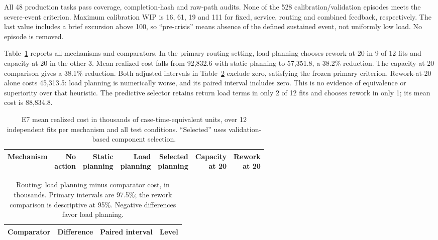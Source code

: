 All 48 production tasks pass coverage, completion-hash and raw-path audits. None of the 528 calibration/validation episodes meets the severe-event criterion. Maximum calibration WIP is 16, 61, 19 and 111 for fixed, service, routing and combined feedback, respectively. The last value includes a brief excursion above 100, so ``pre-crisis'' means absence of the defined sustained event, not uniformly low load. No episode is removed.

Table~\ref{tab:e7cost} reports all mechanisms and comparators. In the primary routing setting, load planning chooses rework-at-20 in 9 of 12 fits and capacity-at-20 in the other 3. Mean realized cost falls from 92,832.6 with static planning to 57,351.8, a 38.2\% reduction. The capacity-at-20 comparison gives a 38.1\% reduction. Both adjusted intervals in Table~\ref{tab:e7contrast} exclude zero, satisfying the frozen primary criterion. Rework-at-20 alone costs 45,313.5: load planning is numerically worse, and its paired interval includes zero. This is no evidence of equivalence or superiority over that heuristic. The predictive selector retains return load terms in only 2 of 12 fits and chooses rework in only 1; its mean cost is 88,834.8.

\begin{table}[t]
\caption{E7 mean realized cost in thousands of case-time-equivalent units, over 12 independent fits per mechanism and all test conditions. ``Selected'' uses validation-based component selection.}\label{tab:e7cost}
\centering\small\setlength{\tabcolsep}{3pt}
\begin{tabular}{lrrrrrr}\toprule
Mechanism & \shortstack{No\\action} & \shortstack{Static\\planning} & \shortstack{Load\\planning} & \shortstack{Selected\\planning} & \shortstack{Capacity\\at 20} & \shortstack{Rework\\at 20}\\\midrule

\end{tabular}
\end{table}
\begin{table}[t]
\caption{Routing: load planning minus comparator cost, in thousands. Primary intervals are 97.5\%; the rework comparison is descriptive at 95\%. Negative differences favor load planning.}\label{tab:e7contrast}
\centering\small
\begin{tabular}{lrrr}\toprule
Comparator & Difference & Paired interval & Level\\\midrule

\end{tabular}
\end{table}

